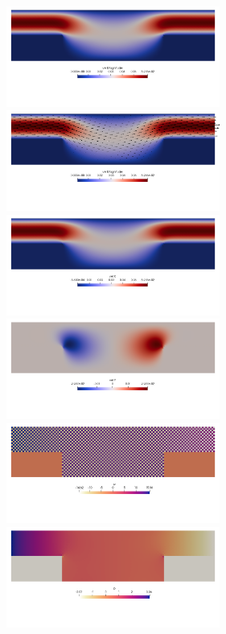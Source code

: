 \begin{center}
\includegraphics[width=7cm]{python_codes/fieldstone_78/results/flow_over_cavity/vel}
\includegraphics[width=7cm]{python_codes/fieldstone_78/results/flow_over_cavity/vel2}\\
\includegraphics[width=7cm]{python_codes/fieldstone_78/results/flow_over_cavity/u}
\includegraphics[width=7cm]{python_codes/fieldstone_78/results/flow_over_cavity/v}\\
\includegraphics[width=7cm]{python_codes/fieldstone_78/results/flow_over_cavity/p0}
\includegraphics[width=7cm]{python_codes/fieldstone_78/results/flow_over_cavity/p1}\\

\end{center}
